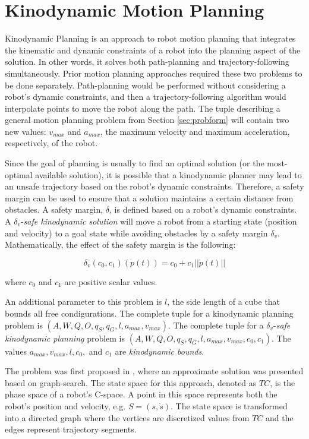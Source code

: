

\section{ Kinodynamic Motion Planning } \label{sec:kino}

Kinodynamic Planning is an approach to robot motion planning that integrates the kinematic and dynamic constraints of a robot into the planning aspect of the solution. In other words, it solves both path-planning and trajectory-following simultaneously. Prior motion planning approaches required these two problems to be done separately. Path-planning would be performed without considering a robot's dynamic constraints, and then a trajectory-following algorithm would interpolate points to move the robot along the path. The tuple describing a general motion planning problem from Section \ref{sec:probform} will contain two new values: $v_{max}$ and $a_{max}$, the maximum velocity and maximum acceleration, respectively, of the robot.


Since the goal of planning is usually to find an optimal solution (or the most-optimal available solution), it is possible that a kinodynamic planner may lead to an unsafe trajectory based on the robot's dynamic constraints. Therefore, a safety margin can be used to ensure that a solution maintains a certain distance from obstacles. A safety margin, $\delta$, is defined based on a robot's dynamic constraints. A $\delta_v$-\emph{safe kinodynamic solution} will move a robot from a starting state (position and velocity) to a goal state while avoiding obstacles by a safety margin $\delta_v$. Mathematically, the effect of the safety margin is the following:

\begin{equation}
\delta_v(c_0, c_1)(\dot{p}(t)) = c_0 + c_1||\dot{p}(t)||
\end{equation}

where $c_0$ and $c_1$ are positive scalar values.

An additional parameter to this problem is $l$, the side length of a cube that bounds all free condigurations. The complete tuple for a kinodynamic planning problem is $(A, W, Q, O, q_S, q_G, l, a_{max}, v_{max})$. The complete tuple for a $\delta_v$-\emph{safe kinodynamic planning} problem is $(A, W, Q, O, q_S, q_G, l, a_{max}, v_{max}, c_0, c_1)$. The values $a_{max}, v_{max}, l, c_0,$ and $c_1$ are \emph{kinodynamic bounds}.


The problem was first proposed in \cite{donald1993kinodynamic}, where an approximate solution was presented based on graph-search. The state space for this approach, denoted as $TC$, is the phase space of a robot's C-space. A point in this space represents both the robot's position and velocity, e.g. $S=(s, \dot{s})$. The state space is transformed into a directed graph where the vertices are discretized values from $TC$ and the edges represent trajectory segments.

